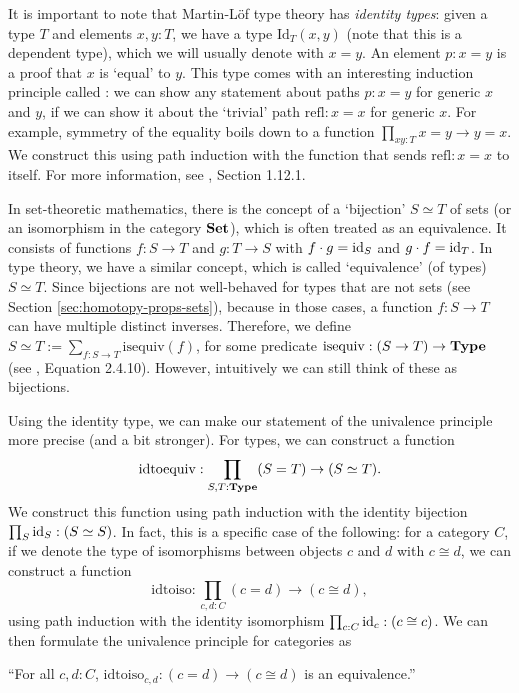 It is important to note that Martin-Löf type theory has \textit{identity types}: given a type $ T $ and elements $ x, y: T $, we have a type $ \mathrm{Id}_T(x, y) $ (note that this is a dependent type), which we will usually denote with $ x = y $. An element $ p: x = y $ is a proof that $ x $ is `equal' to $ y $. This type comes with an interesting induction principle called : we can show any statement about paths $ p: x = y $ for generic $ x $ and $ y $, if we can show it about the `trivial' path $ \mathrm{refl}: x = x $ for generic $ x $. For example, symmetry of the equality boils down to a function $ \prod_{x y : T} x = y \to y = x $. We construct this using path induction with the function that sends $ \mathrm{refl}: x = x $ to itself. For more information, see \autocite{hottbook}, Section 1.12.1.

In set-theoretic mathematics, there is the concept of a `bijection' $ S \simeq T $ of sets (or an isomorphism in the category $ \mathbf{Set} $), which is often treated as an equivalence. It consists of functions $ f: S \to T $ and $ g: T \to S $ with $ f \cdot g = \text{id}_{S} $ and $ g \cdot f = \text{id}_{T} $. In type theory, we have a similar concept, which is called `equivalence' (of types) $ S \simeq T $. Since bijections are not well-behaved for types that are not sets (see Section \ref{sec:homotopy-props-sets}), because in those cases, a function $ f: S \to T $ can have multiple distinct inverses. Therefore, we define $ S \simeq T := \sum_{f: S \to T} \mathrm{isequiv}(f) $, for some predicate $ \mathrm{isequiv}: (S \to T) \to \mathbf{Type} $ (see \autocite{hottbook}, Equation 2.4.10). However, intuitively we can still think of these as bijections.

Using the identity type, we can make our statement of the univalence principle more precise (and a bit stronger). For types, we can construct a function
\[ \mathrm{idtoequiv}: \prod_{S, T: \mathbf{Type}} (S = T) \to (S \simeq T). \]
We construct this function using path induction with the identity bijection $ \prod_S \text{id}_{S}: (S \simeq S) $. In fact, this is a specific case of the following: for a category $ C $, if we denote the type of isomorphisms between objects $ c $ and $ d $ with $ c \cong d $, we can construct a function
\[ \mathrm{idtoiso}: \prod_{c, d: C} (c = d) \to (c \cong d), \]
using path induction with the identity isomorphism $ \prod_{c: C} \text{id}_{c}: (c \cong c) $. We can then formulate the univalence principle for categories as

\enquote{For all $ c, d : C $, $ \mathrm{idtoiso}_{c, d}: (c = d) \to (c \cong d) $ is an equivalence.}

